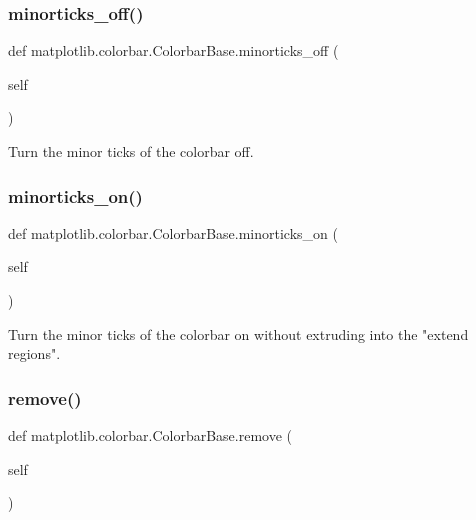 \subsubsection{\texorpdfstring{minorticks\+\_\+off()}{minorticks\_off()}}
{\footnotesize\ttfamily def matplotlib.\+colorbar.\+Colorbar\+Base.\+minorticks\+\_\+off (\begin{DoxyParamCaption}\item[{}]{self }\end{DoxyParamCaption})}

\begin{DoxyVerb}Turn the minor ticks of the colorbar off.\end{DoxyVerb}
 \mbox{\label{classmatplotlib_1_1colorbar_1_1ColorbarBase_a52c9736842933eaf83f295f8375015aa}} 
\subsubsection{\texorpdfstring{minorticks\+\_\+on()}{minorticks\_on()}}
{\footnotesize\ttfamily def matplotlib.\+colorbar.\+Colorbar\+Base.\+minorticks\+\_\+on (\begin{DoxyParamCaption}\item[{}]{self }\end{DoxyParamCaption})}

\begin{DoxyVerb}Turn the minor ticks of the colorbar on without extruding
into the "extend regions".
\end{DoxyVerb}
 \mbox{\label{classmatplotlib_1_1colorbar_1_1ColorbarBase_a20d1a8b4995001e12e91383399149765}} 
\subsubsection{\texorpdfstring{remove()}{remove()}}
{\footnotesize\ttfamily def matplotlib.\+colorbar.\+Colorbar\+Base.\+remove (\begin{DoxyParamCaption}\item[{}]{self }\end{DoxyParamCaption})}

